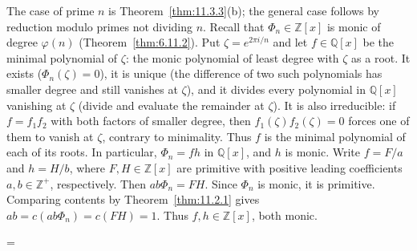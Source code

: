 \documentclass[11pt]{article}
\makeatletter
\theoremstyle{ntstyle}
\let\nt@closedisplay\]
\def\nt@guardedclose{\@ifnextchar\par{\nt@closeafterpar}{\@ifnextchar\end{\postdisplaypenalty\@M\nt@closedisplay}{\nt@closedisplay}}}
\def\nt@closeafterpar\par{\@ifnextchar\par{\nt@closeafterpar}{\@ifnextchar\end{\postdisplaypenalty\@M\nt@closedisplay\par}{\nt@closedisplay\par}}}
\renewenvironment{proof}[1][\proofname]{\par
  \pushQED{\qed}\normalfont\topsep\medskipamount\edef\nt@afterproof{\@endparpenalty=\the\@endparpenalty\relax}\@beginparpenalty\@M\@endparpenalty\@M\let\]\nt@guardedclose\trivlist\item[]\textit{#1\@addpunct{.}} \ignorespaces}{\ifvmode\addpenalty\@M\fi\popQED\nt@afterproof\endtrivlist\@endpefalse}
\makeatother
\begin{document}
\begin{proof} The case of prime $n$ is Theorem~\ref{thm:11.3.3}(b); the general case follows by reduction modulo
	primes not dividing $n$. Recall that $\Phi_n\in\mathbb{Z}[x]$ is monic of
	degree $\varphi(n)$ (Theorem~\ref{thm:6.11.2}). Put $\zeta = e^{2\pi
				i/n}$ and let $f\in\mathbb{Q}[x]$ be the minimal polynomial of
	$\zeta$: the monic polynomial of least degree with $\zeta$ as a root.
	It exists ($\Phi_n(\zeta) = 0$), it is unique (the difference of two
	such polynomials has smaller degree and still vanishes at $\zeta$),
	and it divides every polynomial in $\mathbb{Q}[x]$ vanishing at
	$\zeta$ (divide and evaluate the remainder at $\zeta$). It is also
	irreducible: if $f=f_1f_2$ with both factors of smaller degree, then
	$f_1(\zeta)f_2(\zeta)=0$ forces one of them to vanish at $\zeta$,
	contrary to minimality. Thus $f$ is the minimal polynomial of each of
	its roots. In particular, $\Phi_n=fh$ in $\mathbb{Q}[x]$, and $h$ is monic.
	Write $f=F/a$ and $h=H/b$, where $F,H\in\mathbb{Z}[x]$ are
	primitive with positive leading coefficients $a,b\in\mathbb{Z}^+$,
	respectively. Then $ab\Phi_n=FH$. Since $\Phi_n$ is monic, it is
	primitive. Comparing contents by Theorem~\ref{thm:11.2.1} gives
	$ab=c(ab\Phi_n)=c(FH)=1$. Thus $f,h\in\mathbb{Z}[x]$, both monic.


\end{proof}
\end{document}
